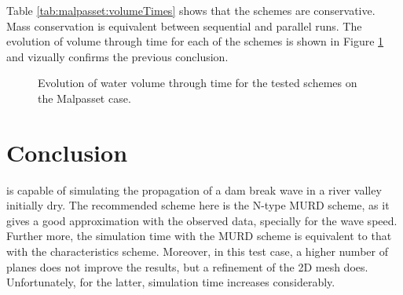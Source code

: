 Table \ref{tab:malpasset:volumeTimes} shows that the schemes are conservative. Mass conservation is equivalent between sequential and parallel runs. The evolution of volume through time for each of the schemes is shown in Figure \ref{fig:malpasset:VoLTime} and vizually confirms the previous conclusion.

\begin{figure}[H]
\centering
  \caption{Evolution of water volume through time for the tested schemes on the Malpasset case.}
\label{fig:malpasset:VoLTime}
\end{figure}

\section{Conclusion}

 is capable of simulating the propagation of a dam break wave in a river valley initially dry. The recommended scheme here is the N-type MURD scheme, as it gives a good approximation with the observed data, specially for the wave speed. Further more, the simulation time with the MURD scheme is equivalent to that with the characteristics scheme.
Moreover, in this test case, a higher number of planes does not improve the results, but a refinement of the 2D mesh does.
Unfortunately, for the latter, simulation time increases considerably.
